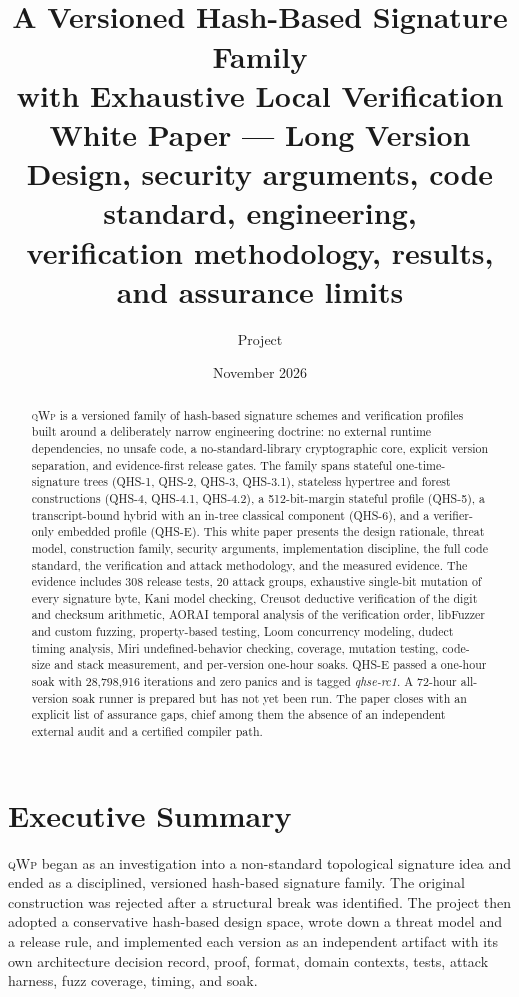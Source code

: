 \documentclass[11pt,a4paper]{article}
\title{
  \vspace*{1.2cm}
  {\Huge\bfseries \qwp}\\[0.35cm]
  {\LARGE A Versioned Hash-Based Signature Family\\[0.15cm]
  with Exhaustive Local Verification}\\[0.9cm]
  {\Large White Paper --- Long Version}\\[0.5cm]
  {\large Design, security arguments, code standard, engineering,\\
  verification methodology, results, and assurance limits}
  \vspace{1.0cm}
}
\author{\large \qwp{} Project}
\date{November 2026}
\newcommand{\qwp}{\textsc{qWp}}
\begin{document}
\maketitle
\thispagestyle{empty}

\begin{abstract}
\noindent
\qwp{} is a versioned family of hash-based signature schemes and verification
profiles built around a deliberately narrow engineering doctrine: no external
runtime dependencies, no unsafe code, a no-standard-library cryptographic core,
explicit version separation, and evidence-first release gates. The family spans
stateful one-time-signature trees (QHS-1, QHS-2, QHS-3, QHS-3.1), stateless
hypertree and forest constructions (QHS-4, QHS-4.1, QHS-4.2), a 512-bit-margin
stateful profile (QHS-5), a transcript-bound hybrid with an in-tree classical
component (QHS-6), and a verifier-only embedded profile (QHS-E). This white
paper presents the design rationale, threat model, construction family,
security arguments, implementation discipline, the full code standard, the
verification and attack methodology, and the measured evidence. The evidence
includes 308 release tests, 20 attack groups, exhaustive single-bit mutation of
every signature byte, Kani model checking, Creusot deductive verification of
the digit and checksum arithmetic, AORAI temporal analysis of the verification
order, libFuzzer and custom fuzzing, property-based testing, Loom concurrency
modeling, dudect timing analysis, Miri undefined-behavior checking, coverage,
mutation testing, code-size and stack measurement, and per-version one-hour
soaks. QHS-E passed a one-hour soak with 28,798,916 iterations and zero panics
and is tagged \emph{qhse-rc1}. A 72-hour all-version soak runner is prepared but
has not yet been run. The paper closes with an explicit list of assurance gaps,
chief among them the absence of an independent external audit and a certified
compiler path.
\end{abstract}

\newpage
\tableofcontents
\listoftables
\listoffigures
\newpage

\section{Executive Summary}

\qwp{} began as an investigation into a non-standard topological signature
idea and ended as a disciplined, versioned hash-based signature family. The
original construction was rejected after a structural break was identified.
The project then adopted a conservative hash-based design space, wrote down a
threat model and a release rule, and implemented each version as an independent
artifact with its own architecture decision record, proof, format, domain
contexts, tests, attack harness, fuzz coverage, timing, and soak.
\end{document}
